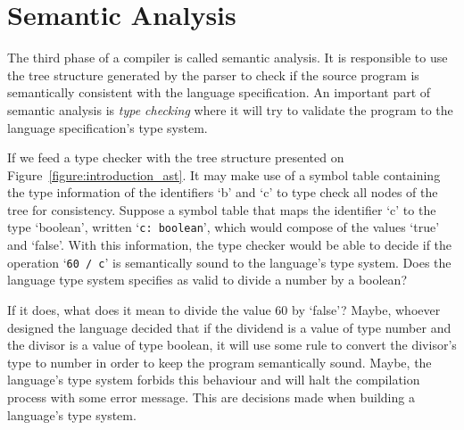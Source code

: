 \documentclass[
    oneside,
    english,
    embeddedlogo,
    noabntexcite
]{ufsc-thesis-rn46-2019}
\begin{document}
\section{Semantic Analysis}

The third phase of a compiler is called semantic analysis.
It is responsible to use the tree structure generated by the parser to check if the source program is semantically consistent with the language specification.
An important part of semantic analysis is \textit{type checking} where it will try to validate the program to the language specification's type system.

If we feed a type checker with the tree structure presented on Figure~\ref{figure:introduction_ast}.
It may make use of a symbol table containing the type information of the identifiers `b' and `c' to type check all nodes of the tree for consistency.
Suppose a symbol table that maps the identifier `c' to the type `boolean', written `\verb+c: boolean+', which would compose of the values `true' and `false'.
With this information, the type checker would be able to decide if the operation `\verb+60 / c+' is semantically sound to the language's type system.
Does the language type system specifies as valid to divide a number by a boolean?


If it does, what does it mean to divide the value 60 by `false'?
Maybe, whoever designed the language decided that if the dividend is a value of type number and the divisor is a value of type boolean, it will use some rule to convert the divisor's type to number in order to keep the program semantically sound.
Maybe, the language's type system forbids this behaviour and will halt the compilation process with some error message.
This are decisions made when building a language's type system.
\end{document}
